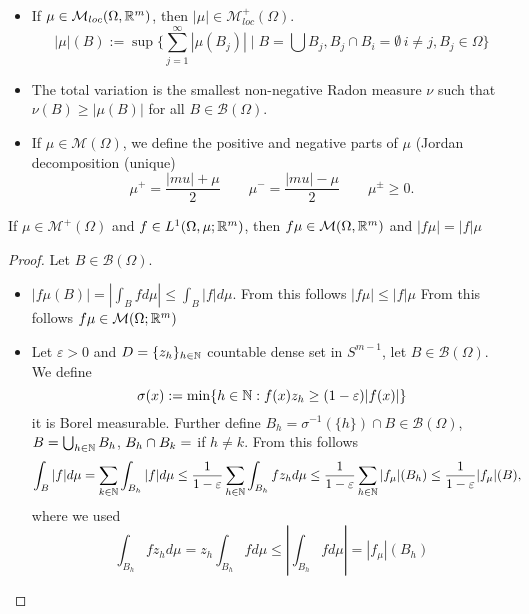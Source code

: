 \begin{remarks}
\begin{itemize}
\item If $\mu \in \mathcal{M}_{loc}(\Omega,\mathbb{R}^m)$, then $|\mu| \in
\mathcal{M}^+_{loc}(\Omega)$.
\[
|\mu|(B) := \sup \{\sum_{j=1} ^\infty |\mu(B_j)| \mid 
B= \bigcup B_j, B_j \cap B_i = \emptyset \, i\neq j, B_j \in \mathcal{\Omega}
\}
\]
\item The total variation is the smallest non-negative Radon measure $\nu$ such
that $\nu (B) \geq |\mu(B)|$ for all $B \in \mathcal{B}(\Omega)$.
\item If $\mu \in \mathcal{M}(\Omega)$, we define the positive and negative
parts of $\mu$ (Jordan decomposition (unique)
\[
\mu^+ = \frac{|mu| + \mu}{2} \qquad 
\mu^- = \frac{|mu| - \mu}{2} \qquad 
\mu^{\pm} \geq 0.
\]
\end{itemize}
\end{remarks}

\begin{lemma}
If $\mu \in \mathcal{M}^+(\Omega)$ and $f\in L^1(\Omega,\mu;\mathbb{R}^m)$, then $f\mu
\in \mathcal{M}(\Omega,\mathbb{R}^m)$ and $|f\mu| = |f|\mu$
\end{lemma}
\begin{proof}
Let $B \in \mathcal{B}(\Omega)$.
\begin{itemize}
\item $|f \mu(B)| = | \int_B f d\mu| \leq \int_B |f| d\mu$. From this follows
$|f\mu| \leq |f| \mu$ From this follows $f\mu \in \mathcal{M}(\Omega;\mathbb{R}^m)$ 
\item Let $\varepsilon > 0$ and $D = \{z_h\}_{h\in\mathbb{N}}$ countable dense set in
$S^{m-1}$, let $B \in \mathcal{B}(\Omega)$. We define 
\[
\sigma(x) := \min \{h\in \mathbb{N}: f(x) z_h \geq (1-\varepsilon)|f(x)|\}
\]
it is Borel measurable. Further define $B_h = \sigma^{-1}(\{h\}) \cap B \in
\mathcal{B}(\Omega)$, $B = \bigcup_{h\in\mathbb{N}} B_h$, $B_h \cap B_k = \empty$ if
$h\neq k$. From this follows
\[
\begin{aligned}
\int_B |f| d\mu 
&= \sum_{k\in\mathbb{N}} \int_{B_h} |f| d\mu 
\leq \frac{1}{1-\varepsilon} \sum_{h\in\mathbb{N}} \int_{B_h} f z_h d\mu 
\leq \frac{1}{1-\varepsilon} \sum_{h\in\mathbb{N}} |f_\mu|(B_h)  
\leq \frac{1}{1-\varepsilon}  |f_\mu|(B),
\end{aligned}
\]
where we used
\[
\int_{B_h} f z_h d\mu 
= z_h \int_{B_h} f d\mu 
\leq \left|\int_{B_h} f d\mu \right|
= |f_\mu|(B_h)  
\]
\end{itemize}
\end{proof}

